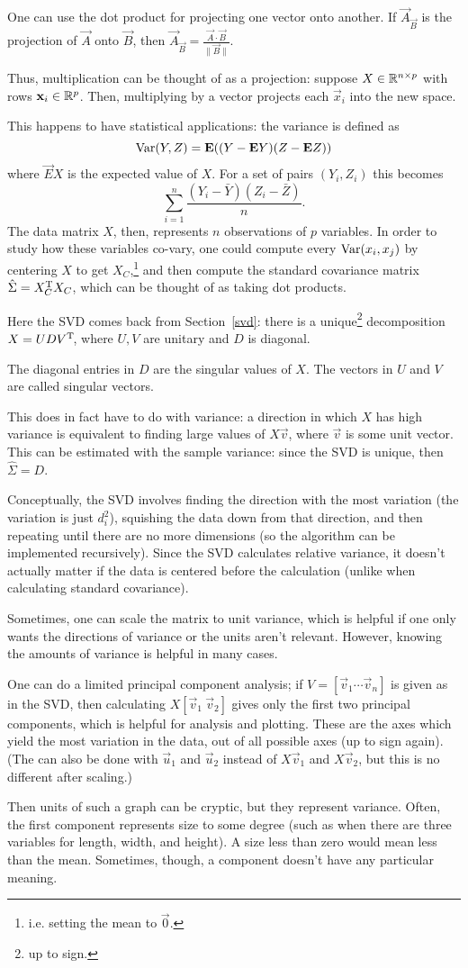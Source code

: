 One can use the dot product for projecting one vector onto another. If $\vec A_{\vec B}$ is the projection of $\vec A$ onto $\vec B$, then $\vec A_{\vec B}= \frac{\vec A\cdot \vec B}{\|\vec B\|}$.

Thus, multiplication can be thought of as a projection: suppose $X\in\mathbb{R}^{n\times p}$ with rows $\mathbf x_i\in\mathbb{R}^p$. Then, multiplying by a vector projects each $\vec x_i$ into the new space.

This happens to have statistical applications: the variance is defined as
\[\operatorname{Var}(Y,Z) = \mathbf E((Y-\mathbf E Y)(Z-\mathbf E Z))\] where $\vec E X$ is the expected value of $X$. For a set of pairs $(Y_i,Z_i)$ this becomes
\[\sum_{i=1}^n \frac{(Y_i-\bar Y)(Z_i-\bar Z)}{n}.\]
The data matrix $X$, then, represents $n$ observations of $p$ variables. In order to study how these variables co-vary, one could compute every $\operatorname{Var}(x_i,x_j)$ by centering $X$ to get $X_C$,\footnote{i.e. setting the mean to $\vec 0$.} and then compute the standard covariance matrix $\hat\Sigma = X_C^{\mathrm{T}} X_C$, which can be thought of as taking dot products.

Here the SVD comes back from Section~\ref{svd}: there is a unique\footnote{up to sign.} decomposition $X = UDV^{\mathrm{T}}\!$, where $U,V$ are unitary and $D$ is diagonal.
\begin{defn}
The diagonal entries in $D$ are the singular values of $X$. The vectors in $U$ and $V$ are called singular vectors.
\end{defn}
This does in fact have to do with variance: a direction in which $X$ has high variance is equivalent to finding large values of $X\vec v$, where $\vec v$ is some unit vector. This can be estimated with the sample variance: since the SVD is unique, then $\hat \Sigma = D$.

Conceptually, the SVD involves finding the direction with the most variation (the variation is just $d_i^2$), squishing the data down from that direction, and then repeating until there are no more dimensions (so the algorithm can be implemented recursively). Since the SVD calculates relative variance, it doesn't actually matter if the data is centered before the calculation (unlike when calculating standard covariance).

Sometimes, one can scale the matrix to unit variance, which is helpful if one only wants the directions of variance or the units aren't relevant. However, knowing the amounts of variance is helpful in many cases.

One can do a limited principal component analysis; if $V = [\vec v_1\dotsb\vec v_n]$ is given as in the SVD, then calculating $X[\vec v_1\ \vec v_2]$ gives only the first two principal components, which is helpful for analysis and plotting. These are the axes which yield the most variation in the data, out of all possible axes (up to sign again). (The can also be done with $\vec u_1$ and $\vec u_2$ instead of $X\vec v_1$ and $X\vec v_2$, but this is no different after scaling.)

Then units of such a graph can be cryptic, but they represent variance. Often, the first component represents size to some degree (such as when there are three variables for length, width, and height). A size less than zero would mean less than the mean. Sometimes, though, a component doesn't have any particular meaning.
